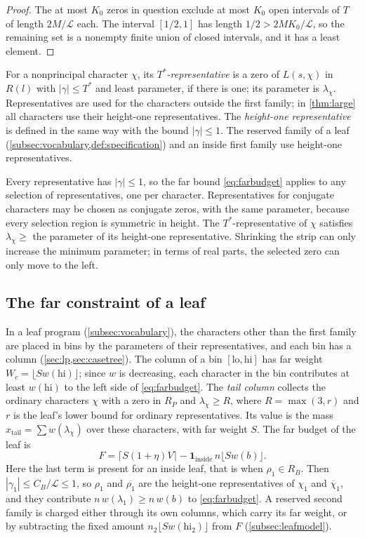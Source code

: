 \documentclass[11pt]{amsart}
\numberwithin{equation}{section}
\theoremstyle{plain}
\theoremstyle{definition}
\theoremstyle{remark}
\newcommand{\LL}{\mathcal{L}}
\newcommand{\lo}{\mathrm{lo}}
\newcommand{\hi}{\mathrm{hi}}
\newcommand{\1}{\mathbf{1}}
\newcommand{\bchi}{\overline{\chi}}
\begin{document}
\begin{proof}
The at most $K_0$ zeros in question exclude at most $K_0$ open intervals of $T$ of length $2M/\LL$
each. The interval $[1/2,1]$ has length $1/2>2MK_0/\LL$, so the remaining set is a nonempty
finite union of closed intervals, and it has a least element.
\end{proof}

\begin{definition}[Representatives]\label{def:representative}
For a nonprincipal character $\chi$, its \emph{$T^*$-representative} is a zero of $L(s,\chi)$ in
$R(l)$ with $|\gamma|\le T^*$ and least parameter, if there is one; its parameter is $\lambda_\chi$.
Representatives are used for the characters outside the first family; in \cref{thm:large} all
characters use their height-one representatives. The \emph{height-one representative} is defined in the same way with the bound
$|\gamma|\le1$. The reserved family of a leaf (\cref{subsec:vocabulary,def:specification}) and an inside first family use
height-one representatives.
\end{definition}

Every representative has $|\gamma|\le1$, so the far bound \eqref{eq:farbudget} applies to any
selection of representatives, one per character. Representatives for conjugate characters
may be chosen as conjugate zeros, with the same parameter, because every selection
region is symmetric in height.
The $T^*$-representative of $\chi$ satisfies $\lambda_\chi\ge$ the parameter of its height-one
representative. Shrinking the strip can only increase the minimum parameter; in terms
of real parts, the selected zero can only move to the left.

\subsection{The far constraint of a leaf}
In a leaf program (\cref{subsec:vocabulary}), the characters other than the first family are placed
in bins by the parameters of their representatives, and each bin has a column
(\cref{sec:lp,sec:casetree}). The column of a bin $[\lo,\hi]$ has far weight
$W_c=\lfloor Sw(\hi)\rfloor$; since $w$ is decreasing, each character in the bin contributes at least
$w(\hi)$ to the left side of \eqref{eq:farbudget}. The
\emph{tail column} collects the ordinary characters $\chi$ with a zero in $R_P$ and $\lambda_\chi\ge R$, where
$R=\max(3,r)$ and $r$ is the leaf's lower bound for ordinary representatives. Its value is the mass
$x_{\mathrm{tail}}=\sum w(\lambda_\chi)$ over these characters, with far weight $S$. The far budget of
the leaf is
\[
  F=\bigl\lceil S(1+\eta)V\bigr\rceil-\1_{\mathrm{inside}}\,n\bigl\lfloor Sw(b)\bigr\rfloor .
\]
Here the last term is present for an inside leaf, that is when $\rho_1\in R_B$. Then
$|\gamma_1|\le C_B/\LL\le1$, so $\rho_1$ and $\overline{\rho_1}$ are the height-one representatives of $\chi_1$ and
$\bchi_1$, and they contribute $n\,w(\lambda_1)\ge n\,w(b)$ to \eqref{eq:farbudget}. A reserved second family is charged either through its own columns, which carry its far
weight, or by subtracting the fixed amount $n_2\lfloor Sw(\hi_2)\rfloor$ from $F$ (\cref{subsec:leafmodel}).
\end{document}
